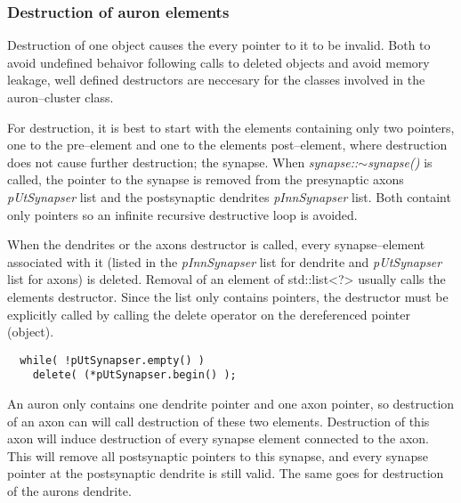 	\subsubsection{Destruction of auron elements}
	Destruction of one object causes the every pointer to it to be invalid. 
	Both to avoid undefined behaivor following calls to deleted objects and avoid memory leakage, well defined destructors are neccesary for the classes involved in the auron--cluster class.

	For destruction, it is best to start with the elements containing only two pointers, one to the pre--element and one to the elements post--element, where destruction does not cause further destruction; the synapse.
	When \emph{synapse::$\sim$synapse()} is called, the pointer to the synapse is removed from the presynaptic axons \emph{pUtSynapser} list and the postsynaptic dendrites \emph{pInnSynapser} list. 
	Both containt only pointers so an infinite recursive destructive loop is avoided. %

	When the dendrites or the axons destructor is called, every synapse--element associated with it (listed in the \emph{pInnSynapser} list for dendrite and \emph{pUtSynapser} list for axons) is deleted. 
	Removal of an element of std::list<?> usually calls the elements destructor. Since the list only contains pointers, the destructor must be explicitly called by calling the delete operator on the dereferenced pointer (object).

\begin{lstlisting}
  while( !pUtSynapser.empty() )
  	delete( (*pUtSynapser.begin() );
\end{lstlisting}

	An auron only contains one dendrite pointer and one axon pointer, so destruction of an axon can will call destruction of these two elements.
	Destruction of this axon will induce destruction of every synapse element connected to the axon. This will remove all postsynaptic pointers to this synapse, and every synapse pointer at the postsynaptic dendrite is still valid.
	The same goes for destruction of the aurons dendrite.
	


